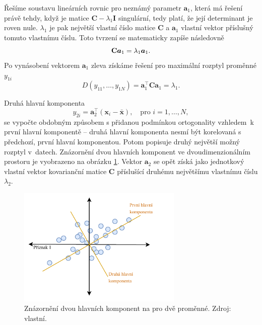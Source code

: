 Řešíme soustavu lineárních rovnic pro neznámý parametr $\bm{a}_1$, která má řešení právě tehdy, když je matice $\mathbf{C} - \lambda_1 \mathbf{I} $ singulární, tedy platí, že její determinant  je roven nule. $\lambda_1$ je pak největší vlastní číslo matice $\mathbf{C}$ a $\bm{a}_1$ vlastní vektor příslušný tomuto vlastnímu číslu. Toto tvrzení se matematicky zapíše následovně
\begin{equation}
    \mathbf{C} \bm{a}_1 = \lambda_1 \bm{a}_1. \\
\end{equation}
Po vynásobení vektorem $\bm{a}_1$ zleva získáme řešení pro maximální rozptyl proměnné $y_{1i}$
\begin{equation}
    D(y_{11}, \ldots, y_{1N}) = \bm{a}_1^\top \mathbf{C} \bm{a}_1 = \lambda_1.
\end{equation}


Druhá hlavní komponenta
\begin{equation}
    y_{2i} = \bm{a}_2^\top (\bm{x}_i - \bar{\bm{x}}), \quad \mbox{pro } i=1,\ldots,N,
\end{equation}
se vypočte obdobným způsobem s přidanou podmínkou ortogonality vzhledem~k první hlavní komponentě -- druhá hlavní komponenta nesmí být korelovaná s předchozí, první hlavní komponentou. Potom popisuje druhý největší možný rozptyl v~datech. Znázornění dvou hlavních komponent ve dvoudimenzionálním prostoru je vyobrazeno na obrázku \ref*{obr:met:PCA1}.
Vektor  $\bm{a}_2$ se opět získá jako jednotkový vlastní vektor kovarianční matice $\mathbf{C}$ příslušící druhému největšímu vlastnímu číslu $\lambda_2$.\cite{bib:PCA1, bib:PCA3} %

\begin{figure}[hbtp!]
    \centering
    \includegraphics[width=0.7\textwidth]{obrazky/PCA.pdf}
    \caption{Znázornění dvou hlavních komponent na pro dvě proměnné. Zdroj: vlastní.}
    \label{obr:met:PCA1}
\end{figure}


